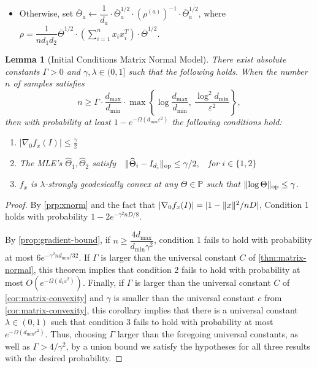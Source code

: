 \documentclass[aos]{imsart}
\newtheorem{lemma}[theorem]{Lemma}
\theoremstyle{definition}
\numberwithin{equation}{section}
\DeclareMathOperator{\op}{op}
\DeclarePairedDelimiter{\norm}{\lVert}{\rVert}
\newcommand{\otheta}{\overline{\Theta}}
\newcommand{\htheta}{\widehat{\Theta}}
\newcommand{\SPD}{\mathbb{P}}
\def\dmin{d_{\min}}
\def\dmax{d_{\max}}
\begin{document}
\begin{Algorithm}
\begin{enumerate}
\begin{itemize}
\vspace{5pt}

\item Otherwise, set $\otheta_a \leftarrow \dfrac{1}{d_a} \cdot \otheta_a^{1/2} \cdot (\rho^{(a)})^{-1} \cdot \otheta_a^{1/2}$, where $\rho = \dfrac{1}{n d_1 d_2} \otheta^{1/2} \cdot \left( \sum_{i=1}^n x_i x_i^T \right) \cdot \otheta^{1/2}$.
\end{itemize}
\end{enumerate}
\caption{Matrix flip-flop algorithm}\label{alg:flip-flop matrix}
\end{Algorithm}

\begin{lemma}[Initial Conditions Matrix Normal Model]\label{lem:matrix-normal-initial-conditions}
There exist absolute constants $\Gamma > 0$ and $\gamma, \lambda \in (0,1]$ such that the following holds.
	When the number $n$ of samples satisfies
	$$n \geq \Gamma \cdot \dfrac{\dmax}{\dmin} \cdot \max\left\{ \log \dfrac{\dmax}{\dmin}, \ \dfrac{\log^2 \dmin}{\varepsilon^2}  \right\},$$
	then with probability at least $1 - e^{- \Omega(\dmin \varepsilon^2)}$ the following conditions hold:
	\begin{enumerate}
		\item $|\nabla_0 f_x(I)| \leq \frac{\gamma}{2}$
		\item The MLE's $\htheta_1, \htheta_2$ satisfy $\ \ \norm{\htheta_i - I_{d_i}}_{\op} \leq \gamma/2, \ \ $ for $i \in \{1,2\}$
		\item $f_x$ is $\lambda$-strongly geodesically convex at any $\Theta \in \SPD$ such that $\norm{\log \Theta}_{\op} \leq \gamma$.
	\end{enumerate}
\end{lemma}

\begin{proof}
By \cref{prp:xnorm} and the fact that $|\nabla_0 f_x(I)| = |1 - \norm{x}^2/nD|$, Condition 1 holds with probability $1 - 2e^{-\gamma^2 nD/8}$.

By \cref{prop:gradient-bound}, if $n \geq \dfrac{4\dmax}{\dmin \gamma^2}$, condition 1 fails to hold with probability at most $6e^{-\gamma^2n\dmin/32}$.
If $\Gamma$ is larger than the universal constant $C$ of \cref{thm:matrix-normal}, this theorem implies that condition 2 fails to hold with probability at most $O(e^{-\Omega(d_1 \varepsilon^2)})$.
Finally, if $\Gamma$ is larger than the universal constant $C$ of \cref{cor:matrix-convexity} and $\gamma$ is smaller than the universal constant $c$ from \cref{cor:matrix-convexity}, this corollary implies that there is a universal constant $\lambda \in (0,1)$ such that condition 3 fails to hold with probability at most $e^{-\Omega(\dmin \varepsilon^2)}$.
Thus, choosing $\Gamma$ larger than the foregoing universal constants, as well as $\Gamma > 4/\gamma^2$, by a union bound we satisfy the hypotheses for all three results with the desired probability.
\end{proof}
\end{document}
